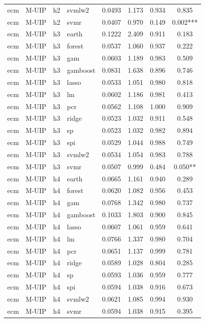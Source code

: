 \begin{ThreePartTable}
\begin{longtable}[t]{llclcccc}
ecm & M-UIP & h2 & svmlw2 & 0.0493 & 1.173 & 0.934 & 0.835\\
ecm & M-UIP & h2 & svmr & 0.0407 & 0.970 & 0.149 & 0.002***\\
\addlinespace
ecm & M-UIP & h3 & earth & 0.1222 & 2.409 & 0.911 & 0.183\\
ecm & M-UIP & h3 & forest & 0.0537 & 1.060 & 0.937 & 0.222\\
ecm & M-UIP & h3 & gam & 0.0603 & 1.189 & 0.983 & 0.509\\
ecm & M-UIP & h3 & gamboost & 0.0831 & 1.638 & 0.896 & 0.746\\
ecm & M-UIP & h3 & lasso & 0.0533 & 1.051 & 0.980 & 0.818\\
ecm & M-UIP & h3 & lm & 0.0602 & 1.186 & 0.981 & 0.413\\
ecm & M-UIP & h3 & pcr & 0.0562 & 1.108 & 1.000 & 0.909\\
ecm & M-UIP & h3 & ridge & 0.0523 & 1.032 & 0.911 & 0.548\\
ecm & M-UIP & h3 & sp & 0.0523 & 1.032 & 0.982 & 0.894\\
ecm & M-UIP & h3 & spi & 0.0529 & 1.044 & 0.988 & 0.749\\
ecm & M-UIP & h3 & svmlw2 & 0.0534 & 1.054 & 0.983 & 0.788\\
ecm & M-UIP & h3 & svmr & 0.0507 & 0.999 & 0.484 & 0.050**\\
\addlinespace
ecm & M-UIP & h4 & earth & 0.0665 & 1.161 & 0.940 & 0.289\\
ecm & M-UIP & h4 & forest & 0.0620 & 1.082 & 0.956 & 0.453\\
ecm & M-UIP & h4 & gam & 0.0768 & 1.342 & 0.980 & 0.737\\
ecm & M-UIP & h4 & gamboost & 0.1033 & 1.803 & 0.900 & 0.845\\
ecm & M-UIP & h4 & lasso & 0.0607 & 1.061 & 0.959 & 0.641\\
ecm & M-UIP & h4 & lm & 0.0766 & 1.337 & 0.980 & 0.704\\
ecm & M-UIP & h4 & pcr & 0.0651 & 1.137 & 0.999 & 0.781\\
ecm & M-UIP & h4 & ridge & 0.0589 & 1.028 & 0.804 & 0.285\\
ecm & M-UIP & h4 & sp & 0.0593 & 1.036 & 0.959 & 0.777\\
ecm & M-UIP & h4 & spi & 0.0594 & 1.038 & 0.916 & 0.673\\
ecm & M-UIP & h4 & svmlw2 & 0.0621 & 1.085 & 0.994 & 0.930\\
ecm & M-UIP & h4 & svmr & 0.0594 & 1.038 & 0.915 & 0.395\\

\end{longtable}
\end{ThreePartTable}
